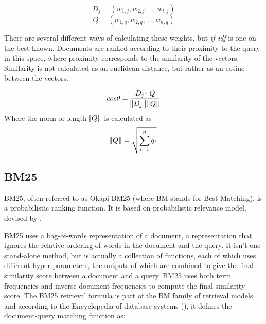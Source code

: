 \begin{equation}
D_j = (w_{1,j}, w_{2,j},...,w_{t,j})
\end{equation}
\begin{equation}
Q = (w_{1,q}, w_{2,q},...,w_{n,q}) 
\end{equation}

There are several different ways of calculating these weights, but \textit{tf-idf} is one on the best known. Documents are ranked according to their proximity to the query in this space, where proximity corresponds to the similarity of the vectors. Similarity is not calculated as an euclidean distance, but rather as an cosine between the vectors.

\begin{equation}
cos\theta = \frac{D_j \cdot Q}{\norm{D_j} \norm{Q}}  
\end{equation} 
Where the norm or length $ \norm{Q} $ is calculated as
\begin{equation}
\norm{Q} = \sqrt{\sum\limits_{i=1}^n q_i }  
\end{equation}


\subsection{BM25}

BM25, often referred to as Okapi BM25 (where BM stands for Best Matching), is a probabilistic ranking function. It is based on probabilistic relevance model, devised by \citep{robertson1996okapi}. 

BM25 uses a bag-of-words representation of a document, a representation that ignores the relative ordering of words in the document and the query. It isn't one stand-alone method, but is actually a collection of functions, each of which uses different hyper-parameters, the outputs of which are combined to give the final similarity score between a document and a query. BM25 uses both term frequencies and inverse document frequencies to compute the final similarity score. The BM25 retrieval formula is part of the BM family of retrieval models and according to the Encyclopedia of database systems (\citep{amati2009bm25}), it defines the document-query matching function as:

